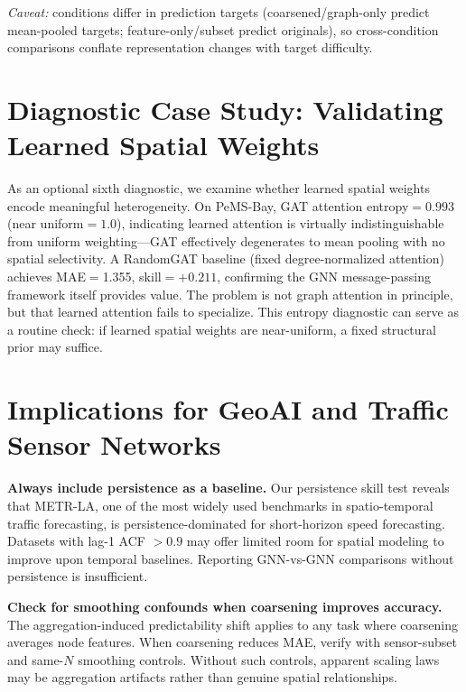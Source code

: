 \documentclass[sigconf]{acmart}
\begin{document}
\textit{Caveat:} conditions differ in prediction targets (coarsened/graph-only predict mean-pooled targets; feature-only/subset predict originals), so cross-condition comparisons conflate representation changes with target difficulty.

\section{Diagnostic Case Study: Validating Learned Spatial Weights}

As an optional sixth diagnostic, we examine whether learned spatial weights encode meaningful heterogeneity. On PeMS-Bay, GAT attention entropy${=}0.993$ (near uniform${=}1.0$), indicating learned attention is virtually indistinguishable from uniform weighting---GAT effectively degenerates to mean pooling with no spatial selectivity. A RandomGAT baseline (fixed degree-normalized attention) achieves MAE$=$1.355, skill$={+}0.211$, confirming the GNN message-passing framework itself provides value. The problem is not graph attention in principle, but that learned attention fails to specialize. This entropy diagnostic can serve as a routine check: if learned spatial weights are near-uniform, a fixed structural prior may suffice.

\section{Implications for GeoAI and Traffic Sensor Networks}

\textbf{Always include persistence as a baseline.} Our persistence skill test reveals that METR-LA, one of the most widely used benchmarks in spatio-temporal traffic forecasting, is persistence-dominated for short-horizon speed forecasting. Datasets with lag-1 ACF $> 0.9$ may offer limited room for spatial modeling to improve upon temporal baselines. Reporting GNN-vs-GNN comparisons without persistence is insufficient.

\textbf{Check for smoothing confounds when coarsening improves accuracy.} The aggregation-induced predictability shift applies to any task where coarsening averages node features. When coarsening reduces MAE, verify with sensor-subset and same-$N$ smoothing controls. Without such controls, apparent scaling laws may be aggregation artifacts rather than genuine spatial relationships.
\end{document}

